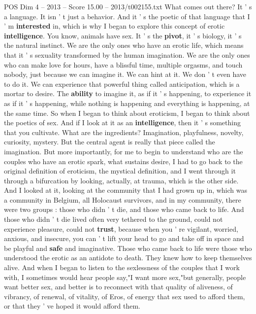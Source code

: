 \begin{textsample}{POS Dim 4 – 2013 – Score 15.00 – 2013/t002155.txt}
What comes out there?
It ' s a language.
It isn ' t just a behavior.
And it ' s the poetic of that language that I ' m \textbf{interested} in, which is why I began to explore this concept of erotic \textbf{intelligence}.
You know, animals have sex.
It ' s the \textbf{pivot}, it ' s biology, it ' s the natural instinct.
We are the only ones who have an erotic life, which means that it ' s sexuality transformed by the human imagination.
We are the only ones who can make love for hours, have a blissful time, multiple orgasms, and touch nobody, just because we can imagine it.
We can hint at it.
We don ' t even have to do it.
We can experience that powerful thing called anticipation, which is a mortar to desire.
The \textbf{ability} to imagine it, as if it ' s happening, to experience it as if it ' s happening, while nothing is happening and everything is happening, at the same time.
So when I began to think about eroticism, I began to think about the poetics of sex.
And if I look at it as an \textbf{intelligence}, then it ' s something that you cultivate.
What are the ingredients?
Imagination, playfulness, novelty, curiosity, mystery.
But the central agent is really that piece called the imagination.
But more importantly, for me to begin to understand who are the couples who have an erotic spark, what sustains desire, I had to go back to the original definition of eroticism, the mystical definition, and I went through it through a bifurcation by looking, actually, at trauma, which is the other side.
And I looked at it, looking at the community that I had grown up in, which was a community in Belgium, all Holocaust survivors, and in my community, there were two groups : those who didn ' t die, and those who came back to life.
And those who didn ' t die lived often very tethered to the ground, could not experience pleasure, could not \textbf{trust}, because when you ' re vigilant, worried, anxious, and insecure, you can ' t lift your head to go and take off in space and be playful and \textbf{safe} and imaginative.
Those who came back to life were those who understood the erotic as an antidote to death.
They knew how to keep themselves alive.
And when I began to listen to the sexlessness of the couples that I work with, I sometimes would hear people say,"I want more sex,"but generally, people want better sex, and better is to reconnect with that quality of aliveness, of vibrancy, of renewal, of vitality, of Eros, of energy that sex used to afford them, or that they ' ve hoped it would afford them.

\end{textsample}
